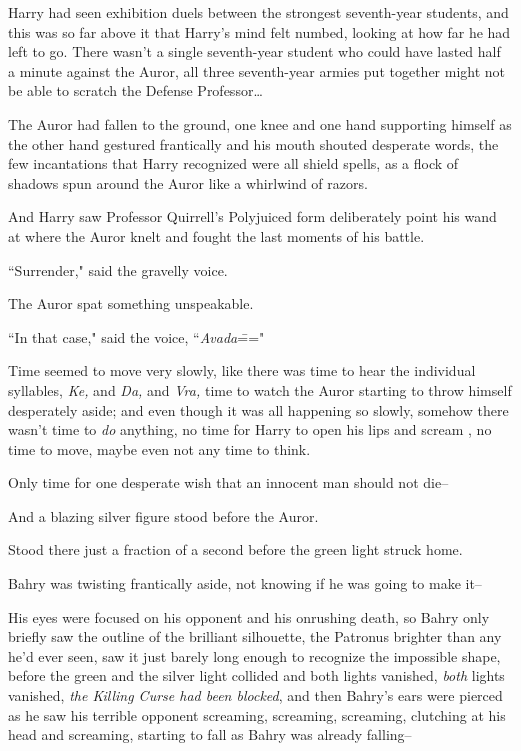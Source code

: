 Harry had seen exhibition duels between the strongest seventh-year students, and this was so far above it that Harry's mind felt numbed, looking at how far he had left to go. There wasn't a single seventh-year student who could have lasted half a minute against the Auror, all three seventh-year armies put together might not be able to scratch the Defense Professor{\ldots}

The Auror had fallen to the ground, one knee and one hand supporting himself as the other hand gestured frantically and his mouth shouted desperate words, the few incantations that Harry recognized were all shield spells, as a flock of shadows spun around the Auror like a whirlwind of razors.

And Harry saw Professor Quirrell's Polyjuiced form deliberately point his wand at where the Auror knelt and fought the last moments of his battle.

``Surrender," said the gravelly voice.

The Auror spat something unspeakable.

``In that case," said the voice, ``\emph{Avada}\==="

Time seemed to move very slowly, like there was time to hear the individual syllables, \emph{Ke,} and \emph{Da,} and \emph{Vra,} time to watch the Auror starting to throw himself desperately aside; and even though it was all happening so slowly, somehow there wasn't time to \emph{do} anything, no time for Harry to open his lips and scream , no time to move, maybe even not any time to think.

Only time for one desperate wish that an innocent man should not die\---

And a blazing silver figure stood before the Auror.

Stood there just a fraction of a second before the green light struck home.

\later

Bahry was twisting frantically aside, not knowing if he was going to make it\---

His eyes were focused on his opponent and his onrushing death, so Bahry only briefly saw the outline of the brilliant silhouette, the Patronus brighter than any he'd ever seen, saw it just barely long enough to recognize the impossible shape, before the green and the silver light collided and both lights vanished, \emph{both} lights vanished, \emph{the Killing Curse had been blocked}, and then Bahry's ears were pierced as he saw his terrible opponent screaming, screaming, screaming, clutching at his head and screaming, starting to fall as Bahry was already falling\---

